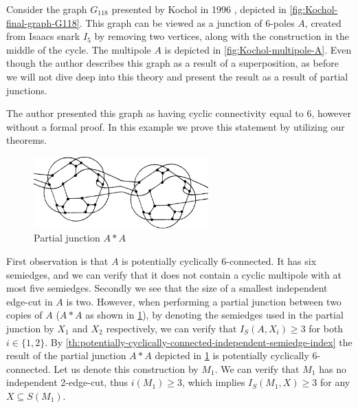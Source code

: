 \documentclass[12pt, twoside]{book}
\begin{document}
\begin{example}
	Consider the graph $G_{118}$ presented by Kochol in 1996 \cite{Kochol1996}, depicted in \cref{fig:Kochol-final-graph-G118}. This graph can be viewed as a junction of 6-poles $A$, created from Isaacs snark $I_5$ \cite{Isaacs1975} by removing two vertices, along with the construction in the middle of the cycle. The multipole $A$ is depicted in \cref{fig:Kochol-multipole-A}. Even though the author describes this graph as a result of a superposition, as before we will not dive deep into this theory and present the result as a result of partial junctions.
	
	The author presented this graph as having cyclic connectivity equal to 6, however without a formal proof. In this example we prove this statement by utilizing our theorems.
	
		\begin{figure}
		\centering
		\includegraphics[width=0.6\textwidth]{images/Kochol-article/Kochol-multipoles-first-junction}
		\caption{Partial junction $A*A$}
		\label{fig:Kochol-first-partial-junction}
	\end{figure}
	
	First observation is that $A$ is potentially cyclically 6-connected. It has six semiedges, and we can verify that it does not contain a cyclic multipole with at most five semiedges. Secondly we see that the size of a smallest independent edge-cut in $A$ is two. However, when performing a partial junction between two copies of $A$ ($A*A$ as shown in \cref{fig:Kochol-first-partial-junction}), by denoting the semiedges used in the partial junction by $X_1$ and $X_2$ respectively, we can verify that $I_S(A,X_i)\geq 3$ for both $i\in\{1,2\}$. By \cref{th:potentially-cyclically-connected-independent-semiedge-index} the result of the partial junction $A*A$ depicted in \cref{fig:Kochol-first-partial-junction} is potentially cyclically 6-connected. Let us denote this construction by $M_1$. We can verify that $M_1$ has no independent 2-edge-cut, thus $i(M_1)\geq 3$, which implies $I_S(M_1, X)\geq 3$ for any $X\subseteq S(M_1)$.
	

\end{example}
\end{document}

